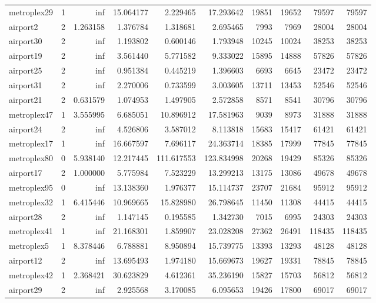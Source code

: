 \begin{longtable}{|l|r|r|r|r|r|r|r|r|r|}
metroplex29 & 1 & inf & 15.064177 & 2.229465 & 17.293642 & 19851 & 19652 & 79597 & 79597 \\
airport2 & 2 & 1.263158 & 1.376784 & 1.318681 & 2.695465 & 7993 & 7969 & 28004 & 28004 \\
airport30 & 2 & inf & 1.193802 & 0.600146 & 1.793948 & 10245 & 10024 & 38253 & 38253 \\
airport19 & 2 & inf & 3.561440 & 5.771582 & 9.333022 & 15895 & 14888 & 57826 & 57826 \\
airport25 & 2 & inf & 0.951384 & 0.445219 & 1.396603 & 6693 & 6645 & 23472 & 23472 \\
airport31 & 2 & inf & 2.270006 & 0.733599 & 3.003605 & 13711 & 13453 & 52546 & 52546 \\
airport21 & 2 & 0.631579 & 1.074953 & 1.497905 & 2.572858 & 8571 & 8541 & 30796 & 30796 \\
metroplex47 & 1 & 3.555995 & 6.685051 & 10.896912 & 17.581963 & 9039 & 8973 & 31888 & 31888 \\
airport24 & 2 & inf & 4.526806 & 3.587012 & 8.113818 & 15683 & 15417 & 61421 & 61421 \\
metroplex17 & 1 & inf & 16.667597 & 7.696117 & 24.363714 & 18385 & 17999 & 77845 & 77845 \\
metroplex80 & 0 & 5.938140 & 12.217445 & 111.617553 & 123.834998 & 20268 & 19429 & 85326 & 85326 \\
airport17 & 2 & 1.000000 & 5.775984 & 7.523229 & 13.299213 & 13175 & 13086 & 49678 & 49678 \\
metroplex95 & 0 & inf & 13.138360 & 1.976377 & 15.114737 & 23707 & 21684 & 95912 & 95912 \\
metroplex32 & 1 & 6.415446 & 10.969665 & 15.828980 & 26.798645 & 11450 & 11308 & 44415 & 44415 \\
airport28 & 2 & inf & 1.147145 & 0.195585 & 1.342730 & 7015 & 6995 & 24303 & 24303 \\
metroplex41 & 1 & inf & 21.168301 & 1.859907 & 23.028208 & 27362 & 26491 & 118435 & 118435 \\
metroplex5 & 1 & 8.378446 & 6.788881 & 8.950894 & 15.739775 & 13393 & 13293 & 48128 & 48128 \\
airport12 & 2 & inf & 13.695493 & 1.974180 & 15.669673 & 19627 & 19331 & 78845 & 78845 \\
metroplex42 & 1 & 2.368421 & 30.623829 & 4.612361 & 35.236190 & 15827 & 15703 & 56812 & 56812 \\
airport29 & 2 & inf & 2.925568 & 3.170085 & 6.095653 & 19426 & 17800 & 69017 & 69017 \\

\end{longtable}
